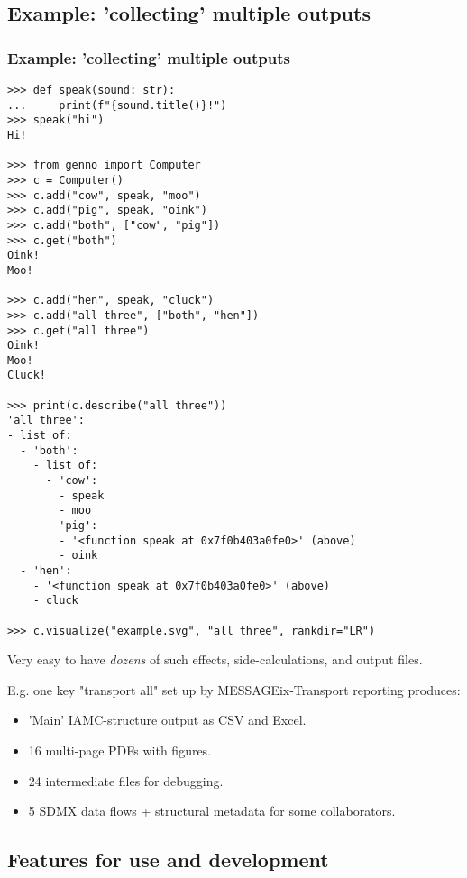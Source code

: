\documentclass[12pt,aspectratio=169]{beamer}
\begin{document}
\subsection{Example: 'collecting' multiple outputs}

\begin{frame}
\frametitle{Example: 'collecting' multiple outputs}

\begin{verbatim}
>>> def speak(sound: str):
...     print(f"{sound.title()}!")
>>> speak("hi")
Hi!

>>> from genno import Computer
>>> c = Computer()
>>> c.add("cow", speak, "moo")
>>> c.add("pig", speak, "oink")
>>> c.add("both", ["cow", "pig"])
>>> c.get("both")
Oink!
Moo!

>>> c.add("hen", speak, "cluck")
>>> c.add("all three", ["both", "hen"])
>>> c.get("all three")
Oink!
Moo!
Cluck!

>>> print(c.describe("all three"))
'all three':
- list of:
  - 'both':
    - list of:
      - 'cow':
        - speak
        - moo
      - 'pig':
        - '<function speak at 0x7f0b403a0fe0>' (above)
        - oink
  - 'hen':
    - '<function speak at 0x7f0b403a0fe0>' (above)
    - cluck

>>> c.visualize("example.svg", "all three", rankdir="LR")
\end{verbatim}

Very easy to have \emph{dozens} of such effects, side-calculations, and output files.

E.g. one key "transport all" set up by MESSAGEix-Transport reporting produces:
\begin{itemize}
  \item 'Main' IAMC-structure output as CSV and Excel.
  \item 16 multi-page PDFs with figures.
  \item 24 intermediate files for debugging.
  \item 5 SDMX data flows + structural metadata for some collaborators.
\end{itemize}
\end{frame}

\subsection{Features for use and development}
\end{document}
